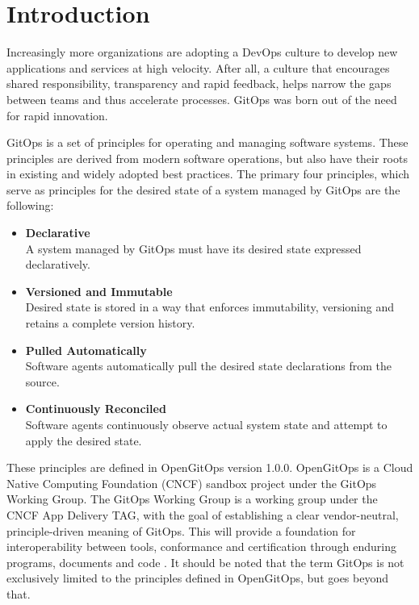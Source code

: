 \chapter{Introduction}


Increasingly more organizations are adopting 
a DevOps culture to develop new applications and services at high velocity. 
After all, a culture that encourages shared responsibility, transparency and rapid feedback, 
helps narrow the gaps between teams and thus accelerate processes.
GitOps was born out of the need for rapid innovation.
\bigskip


\noindent
GitOps is a set of principles for operating and managing software systems.
These principles are derived from modern software operations, but also have their roots 
in existing and widely adopted best practices. The primary four principles,
which serve as principles for the desired state of a
system managed by GitOps are the following:

\begin{itemize}
	\item \textbf{Declarative} \\
		A system managed by GitOps must have its desired state expressed declaratively.
	\item \textbf{Versioned and Immutable} \\
		Desired state is stored in a way that enforces immutability, versioning and retains a complete version history.
	\item \textbf{Pulled Automatically} \\
		Software agents automatically pull the desired state declarations from the source.
	\item \textbf{Continuously Reconciled} \\
		Software agents continuously observe actual system state and attempt to apply the desired state.
\end{itemize}

\noindent
\autocite{gitopsPrinciplesv100}
\bigskip

\noindent
These principles are defined in OpenGitOps version 1.0.0.
OpenGitOps is a Cloud Native Computing Foundation (CNCF) sandbox project under the GitOps Working Group.
The GitOps Working Group is a working group under
the CNCF App Delivery TAG,
with the goal of establishing a clear vendor-neutral,
principle-driven meaning of GitOps.
This will provide a foundation for interoperability between tools, conformance and certification through enduring programs, documents and code
\autocite{opengitopsDocuments}.
%
It should be noted that the term GitOps is not exclusively limited to
the principles defined in OpenGitOps,
but goes beyond that.
\bigskip

